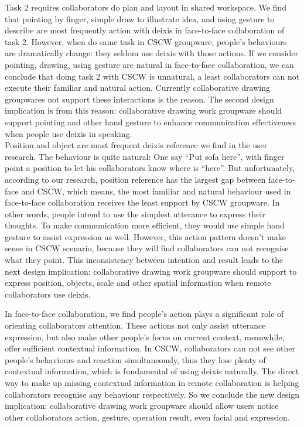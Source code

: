 \documentclass[12pt,twoside]{article}
\begin{document}
Task 2 requires collaborators do plan and layout in shared workspace. We find that pointing by finger, simple draw to illustrate idea, and using gesture to describe are most frequently action with deixis in face-to-face collaboration of task 2. However, when do same task in CSCW groupware, people’s behaviours are dramatically change: they seldom use deixis with those actions. If we consider pointing, drawing, using gesture are natural in face-to-face collaboration, we can conclude that doing task 2 with CSCW is unnatural, a least collaborators can not execute their familiar and natural action. Currently collaborative drawing groupwares not support these interactions is the reason. The second design implication is from this reason: collaborative drawing work groupware should  support pointing and other hand gesture to enhance communication effectiveness when people use deixis in speaking.\\
Position and object are most frequent deixis reference we find in the user research. The behaviour is quite natural: One say “Put sofa here”, with finger point a position to let his collaborators know where is “here”. But unfortunately, according to our research, position reference has the largest gap between face-to-face and CSCW, which means, the most familiar and natural behaviour used in face-to-face collaboration receives the least support by CSCW groupware. In other words, people intend to use the simplest utterance to express their thoughts. To make communication more efficient, they would use simple hand gesture to assist expression as well. However, this action pattern doesn’t make sense in CSCW scenario, because they will find collaborators can not recognise what they point. This inconsistency between intention and result leads to the next design implication: collaborative drawing work groupware should support to express position, objects, scale and other spatial information when remote collaborators use deixis.

In face-to-face collaboration, we find people’s action plays a significant role of orienting collaborators attention. These actions not only assist utterance expression, but also make other people’s focus on current context, meanwhile, offer sufficient contextual information. In CSCW, collaborators can not see other people’s behaviours and reaction simultaneously, thus they lose plenty of contextual information, which is fundamental of using deixis naturally. The direct way to make up missing contextual information in remote collaboration is helping collaborators recognise any behaviour respectively. So we conclude the new design implication: collaborative drawing work groupware should allow users notice other collaborators action, gesture, operation result, even facial and expression. 
\end{document}
